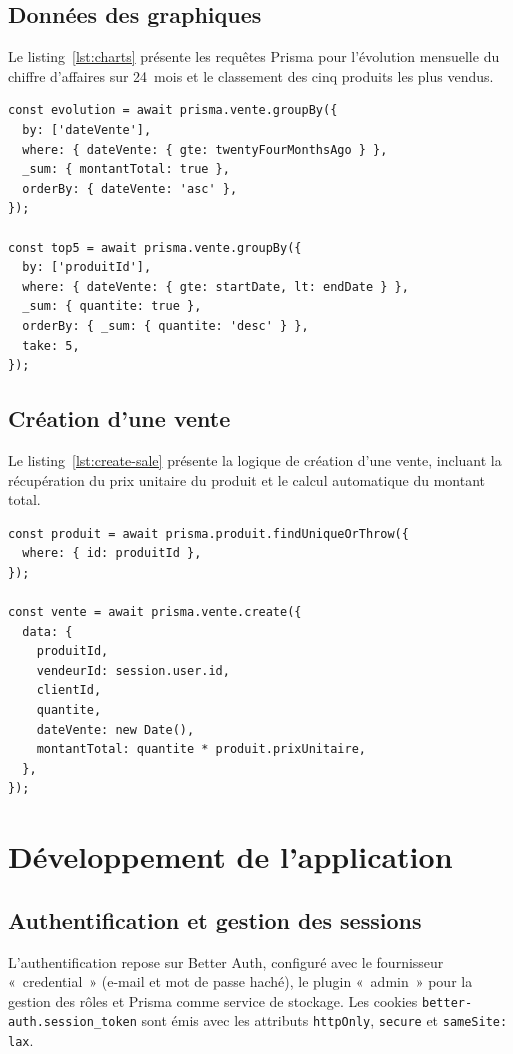 \documentclass[11pt,a4paper]{report}
\begin{document}
\subsection{Données des graphiques}
Le listing~\ref{lst:charts} présente les requêtes Prisma pour l'évolution
mensuelle du chiffre d'affaires sur 24~mois et le classement des cinq produits
les plus vendus.

\begin{lstlisting}[caption={Requêtes Prisma pour les graphiques (route GET /api/stats/charts)},label={lst:charts}]
const evolution = await prisma.vente.groupBy({
  by: ['dateVente'],
  where: { dateVente: { gte: twentyFourMonthsAgo } },
  _sum: { montantTotal: true },
  orderBy: { dateVente: 'asc' },
});

const top5 = await prisma.vente.groupBy({
  by: ['produitId'],
  where: { dateVente: { gte: startDate, lt: endDate } },
  _sum: { quantite: true },
  orderBy: { _sum: { quantite: 'desc' } },
  take: 5,
});
\end{lstlisting}

\subsection{Création d'une vente}
Le listing~\ref{lst:create-sale} présente la logique de création d'une vente,
incluant la récupération du prix unitaire du produit et le calcul automatique du
montant total.

\begin{lstlisting}[caption={Création d'une vente (route POST /api/sales)},label={lst:create-sale}]
const produit = await prisma.produit.findUniqueOrThrow({
  where: { id: produitId },
});

const vente = await prisma.vente.create({
  data: {
    produitId,
    vendeurId: session.user.id,
    clientId,
    quantite,
    dateVente: new Date(),
    montantTotal: quantite * produit.prixUnitaire,
  },
});
\end{lstlisting}

\section{Développement de l'application}

\subsection{Authentification et gestion des sessions}
L'authentification repose sur Better Auth, configuré avec le fournisseur
«~credential~» (e-mail et mot de passe haché), le plugin «~admin~» pour la
gestion des rôles et Prisma comme service de stockage. Les cookies
\texttt{better-auth.session\_token} sont émis avec les attributs
\texttt{httpOnly}, \texttt{secure} et \texttt{sameSite: lax}.
\end{document}
